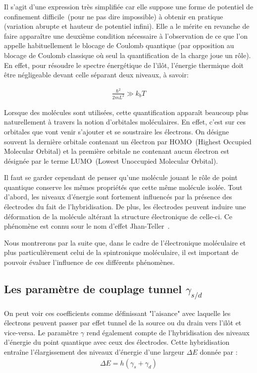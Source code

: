 Il s'agit d'une expression très simplifiée car elle suppose une forme de potentiel de confinement difficile~(pour ne pas dire impossible) à obtenir en pratique (variation abrupte et hauteur de potentiel infini). Elle a le mérite en revanche de faire appara\^itre une deuxième condition nécessaire à l'observation de ce que l'on appelle habituellement le blocage de Coulomb quantique (par opposition au blocage de Coulomb classique où seul la quantification de la charge joue un rôle). En effet, pour résoudre le spectre énergétique de l'il\^ot, l'énergie thermique doit \^etre négligeable devant celle séparant deux niveaux, à savoir:

\begin{eqnarray}
\frac{\hbar^2}{2mL^2} \gg k_bT \nonumber
\end{eqnarray}

Lorsque des molécules sont utilisées, cette quantification apparaît beaucoup plus naturellement à travers la notion d'orbitales moléculaires. En effet, c'est sur ces orbitales que vont venir s'ajouter et se soustraire les électrons. On désigne souvent la dernière orbitale contenant un électron par HOMO~(Highest Occupied Molecular Orbital) et la première orbitale ne contenant aucun électron est désignée par le terme LUMO~(Lowest Unoccupied Molecular Orbital).

Il faut se garder cependant de penser qu'une molécule jouant le r\^ole de point quantique conserve les mêmes propriétés que cette m\^eme molécule isolée. Tout d'abord, les niveaux d'énergie sont fortement influencés par la présence des électrodes du fait de l'hybridisation. De plus, les électrodes peuvent induire une déformation de la molécule altérant la structure électronique de celle-ci. Ce phénomène est connu sour le nom d'effet Jhan-Teller~\cite{Jahn1937}. 

Nous montrerons par la suite que, dans le cadre de l'électronique moléculaire et plus particulièrement celui de la spintronique moléculaire, il est important de pouvoir évaluer l'influence de ces différents phénomènes.

\subsection{Les paramètre de couplage tunnel $\gamma_{s/d}$}

On peut voir ces coefficients comme définissant "l'aisance" avec laquelle les électrons peuvent passer par effet tunnel de la source ou du drain vers l'il\^ot et vice-versa. Le paramètre $\gamma$ rend également compte de l'hybridisation des niveaux d'énergie du point quantique avec ceux des électrodes. Cette hybridisation entraîne l'élargissement des niveaux d'énergie d'une largeur $\Delta E$ donnée par :
\begin{eqnarray}
\Delta E = h (\gamma_s + \gamma_d)
\label{hybridgamma}
\end{eqnarray}

